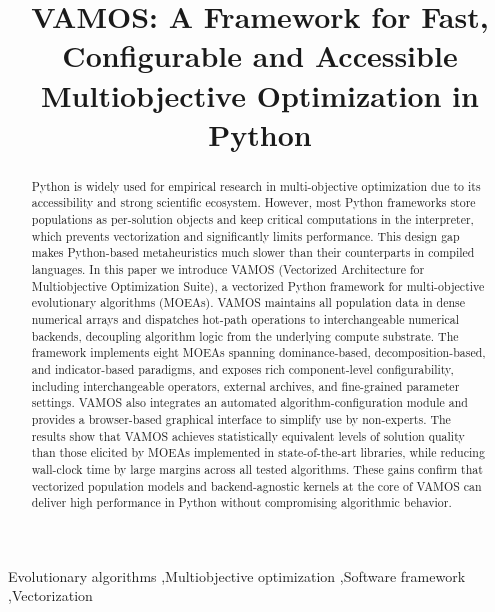 \documentclass[final,5p,times,twocolumn]{elsarticle}
\begin{document}
\begin{frontmatter}


\title{VAMOS: A Framework for Fast, Configurable and Accessible Multiobjective Optimization in Python}

\begin{abstract}
Python is widely used for empirical research in multi-objective optimization due to its accessibility and strong scientific ecosystem. However, most Python frameworks store populations as per-solution objects and keep critical computations in the interpreter, which prevents vectorization and significantly limits performance. This design gap makes Python-based metaheuristics much slower than their counterparts in compiled languages. In this paper we introduce VAMOS (Vectorized Architecture for Multiobjective Optimization Suite), a vectorized Python framework for multi-objective evolutionary algorithms (MOEAs). VAMOS maintains all population data in dense numerical arrays and dispatches hot-path operations to interchangeable numerical backends, decoupling algorithm logic from the underlying compute substrate. The framework implements eight MOEAs spanning dominance-based, decomposition-based, and indicator-based paradigms, and exposes rich component-level configurability, including interchangeable operators, external archives, and fine-grained parameter settings. VAMOS also integrates an automated algorithm-configuration module and provides a browser-based graphical interface to simplify use by non-experts. The results show that VAMOS achieves statistically equivalent levels of solution quality than those elicited by MOEAs implemented in state-of-the-art libraries, while reducing wall-clock time by large margins across all tested algorithms. These gains confirm that vectorized population models and backend-agnostic kernels at the core of VAMOS can deliver high performance in Python without compromising algorithmic behavior.
\end{abstract}

\begin{keyword}
Evolutionary algorithms \sep Multiobjective optimization \sep Software framework \sep Vectorization
\end{keyword}

\end{frontmatter}
\end{document}
